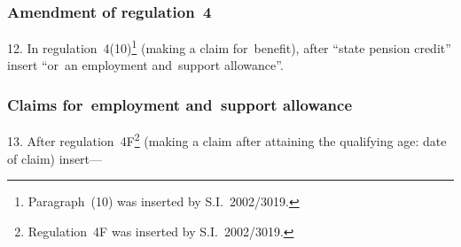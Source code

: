 \documentclass[12pt,a4paper]{article}
\begin{document}
\subsubsection[12. Amendment of regulation~4]{Amendment of regulation~4}

12.  In regulation~4(10)\footnote{Paragraph~(10) was inserted by S.I.~2002/3019.} (making a claim for~benefit), after “state pension credit” insert “or~an employment and~support allowance”.

\subsubsection[13. Claims for~employment and~support allowance]{Claims for~employment and~support allowance}

13.  After regulation~4F\footnote{Regulation~4F was inserted by S.I.~2002/3019.} (making a claim after attaining the qualifying age: date of claim) insert—
\end{document}
